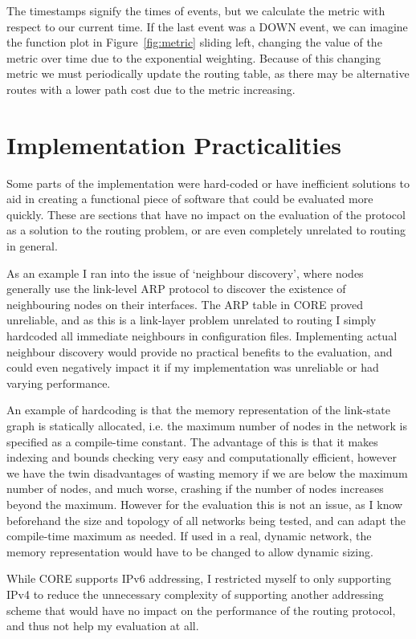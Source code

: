 \documentclass[withindex,glossary,openany]{cam-thesis}
\begin{document}
The timestamps signify the times of events, but we calculate the metric with respect to our current time. If the last event was a DOWN event, we can imagine the function plot in Figure~\ref{fig:metric} sliding left, changing the value of the metric over time due to the exponential weighting. Because of this changing metric we must periodically update the routing table, as there may be alternative routes with a lower path cost due to the metric increasing.

\section{Implementation Practicalities}

Some parts of the implementation were hard-coded or have inefficient solutions to aid in creating a functional piece of software that could be evaluated more quickly. These are sections that have no impact on the evaluation of the protocol as a solution to the routing problem, or are even completely unrelated to routing in general.

As an example I ran into the issue of `neighbour discovery', where nodes generally use the link-level ARP protocol to discover the existence of neighbouring nodes on their interfaces. The ARP table in CORE proved unreliable, and as this is a link-layer problem unrelated to routing I simply hardcoded all immediate neighbours in configuration files. Implementing actual neighbour discovery would provide no practical benefits to the evaluation, and could even negatively impact it if my implementation was unreliable or had varying performance.

An example of hardcoding is that the memory representation of the link-state graph is statically allocated, i.e. the maximum number of nodes in the network is specified as a compile-time constant. The advantage of this is that it makes indexing and bounds checking very easy and computationally efficient, however we have the twin disadvantages of wasting memory if we are below the maximum number of nodes, and much worse, crashing if the number of nodes increases beyond the maximum. However for the evaluation this is not an issue, as I know beforehand the size and topology of all networks being tested, and can adapt the compile-time maximum as needed. If used in a real, dynamic network, the memory representation would have to be changed to allow dynamic sizing.

While CORE supports IPv6 addressing, I restricted myself to only supporting IPv4 to reduce the unnecessary complexity of supporting another addressing scheme that would have no impact on the performance of the routing protocol, and thus not help my evaluation at all.
\end{document}

